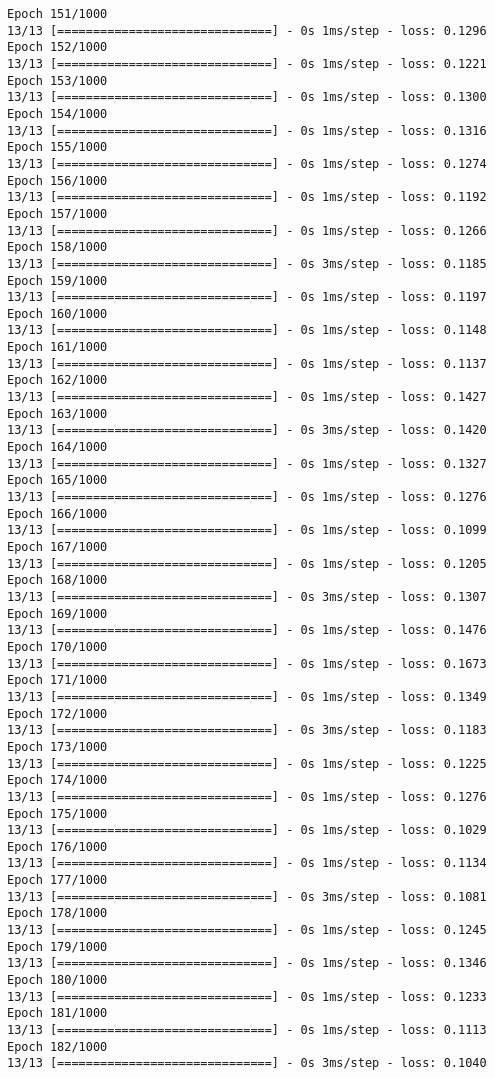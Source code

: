 \documentclass[11pt]{article}
\begin{document}
\begin{Verbatim}[commandchars=\\\{\}]
Epoch 151/1000
13/13 [==============================] - 0s 1ms/step - loss: 0.1296
Epoch 152/1000
13/13 [==============================] - 0s 1ms/step - loss: 0.1221
Epoch 153/1000
13/13 [==============================] - 0s 1ms/step - loss: 0.1300
Epoch 154/1000
13/13 [==============================] - 0s 1ms/step - loss: 0.1316
Epoch 155/1000
13/13 [==============================] - 0s 1ms/step - loss: 0.1274
Epoch 156/1000
13/13 [==============================] - 0s 1ms/step - loss: 0.1192
Epoch 157/1000
13/13 [==============================] - 0s 1ms/step - loss: 0.1266
Epoch 158/1000
13/13 [==============================] - 0s 3ms/step - loss: 0.1185
Epoch 159/1000
13/13 [==============================] - 0s 1ms/step - loss: 0.1197
Epoch 160/1000
13/13 [==============================] - 0s 1ms/step - loss: 0.1148
Epoch 161/1000
13/13 [==============================] - 0s 1ms/step - loss: 0.1137
Epoch 162/1000
13/13 [==============================] - 0s 1ms/step - loss: 0.1427
Epoch 163/1000
13/13 [==============================] - 0s 3ms/step - loss: 0.1420
Epoch 164/1000
13/13 [==============================] - 0s 1ms/step - loss: 0.1327
Epoch 165/1000
13/13 [==============================] - 0s 1ms/step - loss: 0.1276
Epoch 166/1000
13/13 [==============================] - 0s 1ms/step - loss: 0.1099
Epoch 167/1000
13/13 [==============================] - 0s 1ms/step - loss: 0.1205
Epoch 168/1000
13/13 [==============================] - 0s 3ms/step - loss: 0.1307
Epoch 169/1000
13/13 [==============================] - 0s 1ms/step - loss: 0.1476
Epoch 170/1000
13/13 [==============================] - 0s 1ms/step - loss: 0.1673
Epoch 171/1000
13/13 [==============================] - 0s 1ms/step - loss: 0.1349
Epoch 172/1000
13/13 [==============================] - 0s 3ms/step - loss: 0.1183
Epoch 173/1000
13/13 [==============================] - 0s 1ms/step - loss: 0.1225
Epoch 174/1000
13/13 [==============================] - 0s 1ms/step - loss: 0.1276
Epoch 175/1000
13/13 [==============================] - 0s 1ms/step - loss: 0.1029
Epoch 176/1000
13/13 [==============================] - 0s 1ms/step - loss: 0.1134
Epoch 177/1000
13/13 [==============================] - 0s 3ms/step - loss: 0.1081
Epoch 178/1000
13/13 [==============================] - 0s 1ms/step - loss: 0.1245
Epoch 179/1000
13/13 [==============================] - 0s 1ms/step - loss: 0.1346
Epoch 180/1000
13/13 [==============================] - 0s 1ms/step - loss: 0.1233
Epoch 181/1000
13/13 [==============================] - 0s 1ms/step - loss: 0.1113
Epoch 182/1000
13/13 [==============================] - 0s 3ms/step - loss: 0.1040

\end{Verbatim}
\end{document}
